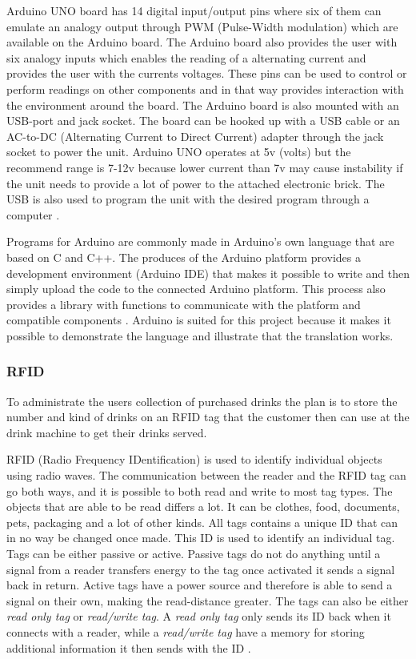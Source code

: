 Arduino UNO board has 14 digital input/output pins where six of them can emulate an analogy output through PWM (Pulse-Width modulation) which are available on the Arduino board. The Arduino board also provides the user with six analogy inputs which enables the reading of a alternating current and provides the user with the currents voltages. These pins can be used to control or perform readings on other components and in that way provides interaction with the environment around the board.
The Arduino board is also mounted with an USB-port and jack socket. The board can be hooked up with a USB cable or an AC-to-DC (Alternating Current to Direct Current) adapter through the jack socket to power the unit. Arduino UNO operates at 5v (volts) but the recommend range is 7-12v because lower current than 7v may cause instability if the unit needs to provide a lot of power to the attached electronic brick. The USB is also used to program the unit with the desired program through a computer \citep{ArduinoUno}.

Programs for Arduino are commonly made in Arduino's own language that are based on C and C++. The produces of the Arduino platform provides a development environment (Arduino IDE) that makes it possible to write and then simply upload the code to the connected Arduino platform. This process also provides a library with functions to communicate with the platform and compatible components \citep{ArduinoLanguage}.
Arduino is suited for this project because it makes it possible to demonstrate the language and illustrate that the translation works.

\subsubsection{RFID}
To administrate the users collection of purchased drinks the plan is to store the number and kind of drinks on an RFID tag that the customer then can use at the drink machine to get their drinks served.

RFID (Radio Frequency IDentification) is used to identify individual objects using radio waves.
The communication between the reader and the RFID tag can go both ways, and it is possible to both read and write to most tag types. 
The objects that are able to be read differs a lot. It can be clothes, food, documents, pets, packaging and a lot of other kinds. 
All tags contains a unique ID that can in no way be changed once made. This ID is used to identify an individual tag.
Tags can be either passive or active. Passive tags do not do anything until a signal from a reader transfers energy to the tag once activated it sends a signal back in return. Active tags have a power source and therefore is able to send a signal on their own, making the read-distance greater.
The tags can also be either \textit{read only tag} or \textit{read/write tag}. A \textit{read only tag} only sends its ID back when it connects with a reader, while a \textit{read/write tag} have a memory for storing additional information it then sends with the ID \citep{RFID}.

